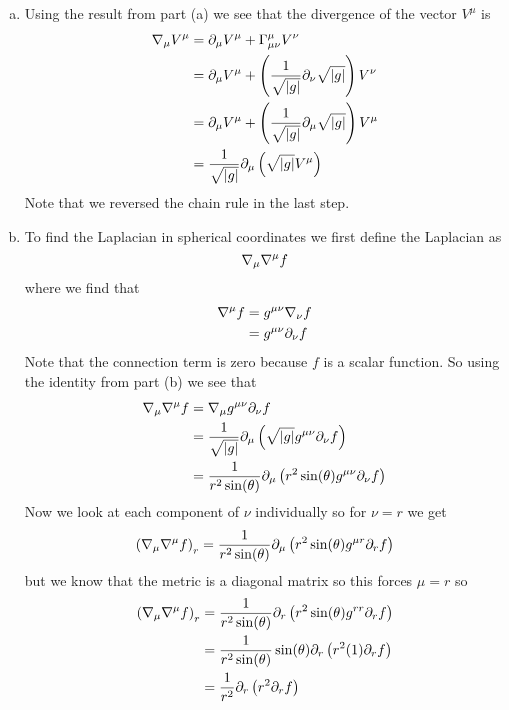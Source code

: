\documentclass[11pt]{article}
\numberwithin{equation}{section}
\begin{document}
\begin{enumerate}[(a)]
\item
Using the result from part (a) we see that the divergence of the vector $V^{\mu}$ is
\begin{align*}
\bold\nabla_{\mu}V^{\mu} &= \partial_{\mu}V^{\mu}+\Gamma^{\mu}_{\mu\nu}V^{\nu}\\
&= \partial_{\mu}V^{\mu}+ \left(\frac{1}{\sqrt{|g|}}\partial_{\nu}\sqrt{|g|}\right)V^{\nu}\\
&= \partial_{\mu}V^{\mu}+ \left(\frac{1}{\sqrt{|g|}}\partial_{\mu}\sqrt{|g|}\right)V^{\mu}\\
&= \frac{1}{\sqrt{|g|}}\partial_{\mu}\left(\sqrt{|g|}V^{\mu}\right)
\end{align*}
Note that we reversed the chain rule in the last step.

\item
To find the Laplacian in spherical coordinates we first define the Laplacian as
$$\bold\nabla_{\mu}\bold\nabla^{\mu}f$$
where we find that 
\begin{align*}
\bold\nabla^{\mu}f &= g^{\mu\nu}\bold\nabla_{\nu}f\\
&= g^{\mu\nu}\partial_{\nu}f
\end{align*}
Note that the connection term is zero because $f$ is a scalar function. So using the identity from part (b) we see that
\begin{align*}
\bold\nabla_{\mu}\bold\nabla^{\mu}f &= \bold\nabla_{\mu}g^{\mu\nu}\partial_{\nu}f\\
&= \frac{1}{\sqrt{|g|}}\partial_{\mu}\left(\sqrt{|g|}g^{\mu\nu}\partial_{\nu}f\right)\\
&= \frac{1}{r^2\sin(\theta)}\partial_{\mu}\left(r^2\sin(\theta)g^{\mu\nu}\partial_{\nu}f\right)
\end{align*}
Now we look at each component of $\nu$ individually so for $\nu=r$ we get
\begin{align*}
\left(\bold\nabla_{\mu}\bold\nabla^{\mu}f\right)_{r}&= \frac{1}{r^2\sin(\theta)}\partial_{\mu}\left(r^2\sin(\theta)g^{\mu r}\partial_{r}f\right)\\
\end{align*}
but we know that the metric is a diagonal matrix so this forces $\mu=r$ so
\begin{align*}
\left(\bold\nabla_{\mu}\bold\nabla^{\mu}f\right)_{r}&= \frac{1}{r^2\sin(\theta)}\partial_{r}\left(r^2\sin(\theta)g^{rr}\partial_{r}f\right)\\
&= \frac{1}{r^2\sin(\theta)}\sin(\theta)\partial_{r}\left(r^2(1)\partial_{r}f\right)\\
&= \frac{1}{r^2}\partial_{r}\left(r^2\partial_{r}f\right)
\end{align*}

\end{enumerate}
\end{document}
